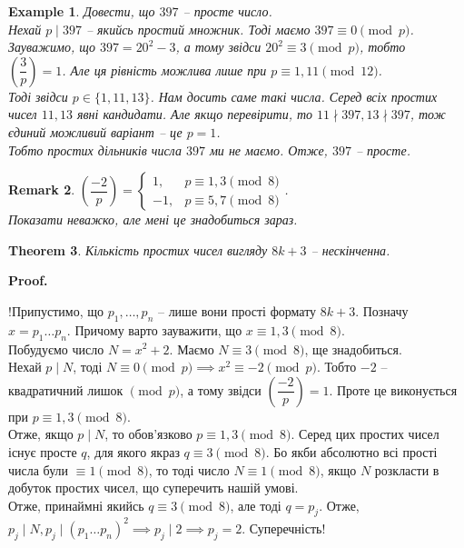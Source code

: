 \documentclass[a4paper, 10pt]{article}
\makeatletter
\theoremstyle{theoremdd}
\newtheorem{theorem}{Theorem}[subsection]
\theoremstyle{theoremdd}
\theoremstyle{theoremdd}
\theoremstyle{theoremdd}
\newtheorem{example}[theorem]{Example}
\theoremstyle{theoremdd}
\theoremstyle{theoremdd}
\newtheorem{remark}[theorem]{Remark}
\theoremstyle{theoremdd}
\theoremstyle{theoremdd}
\renewenvironment{proof}[1][Proof.\\]{\par
\pushQED{\hfill \qed}%
\normalfont \topsep6\p@\@plus6\p@\relax
\trivlist
\item\relax
{\bfseries
#1\@addpunct{.}}\hspace\labelsep\ignorespaces
}{%
\popQED\endtrivlist\@endpefalse
}
\makeatother
\begin{document}
\begin{example}
Довести, що $397$ -- просте число.\\
Нехай $p \mid 397$ -- якийсь простий множник. Тоді маємо $397 \equiv 0 \pmod p$.\\
Зауважимо, що $397 = 20^2-3$, а тому звідси $20^2 \equiv 3 \pmod p$, тобто\\
$\left( \dfrac{3}{p} \right) = 1$. Але ця рівність можлива лише при $p \equiv 1,11 \pmod {12}$.\\
Тоді звідси $p \in \{1,11,13\}$. Нам досить саме такі числа. Серед всіх простих чисел $11,13$ явні кандидати. Але якщо перевірити, то $11 \nmid 397, 13 \nmid 397$, тож єдиний можливий варіант -- це $p = 1$.\\
Тобто простих дільників числа $397$ ми не маємо. Отже, $397$ -- просте.
\end{example}

\begin{remark}
$\left( \dfrac{-2}{p} \right) = \begin{cases} 1, & p \equiv 1,3 \pmod 8 \\ -1, & p \equiv 5,7 \pmod 8 \end{cases}$.\\
Показати неважко, але мені це знадобиться зараз.
\end{remark}

\begin{theorem}
Кількість простих чисел вигляду $8k+3$ -- нескінченна.
\end{theorem}

\begin{proof}
!Припустимо, що $p_1,\dots,p_n$ -- лише вони прості формату $8k+3$. Позначу $x = p_1\dots p_n$. Причому варто зауважити, що $x \equiv 1,3 \pmod 8$.\\
Побудуємо число $N = x^2+2$. Маємо $N \equiv 3 \pmod 8$, ще знадобиться.\\
Нехай $p \mid N$, тоді $N \equiv 0 \pmod p \implies x^2 \equiv -2 \pmod p$. Тобто $-2$ -- квадратичний лишок $\!\! \pmod p$, а тому звідси $\left( \dfrac{-2}{p} \right) = 1$. Проте це виконується при $p \equiv 1,3 \pmod 8$.\\
Отже, якщо $p \mid N$, то обов'язково $p \equiv 1,3 \pmod 8$. Серед цих простих чисел існує просте $q$, для якого якраз $q \equiv 3 \pmod 8$. Бо якби абсолютно всі прості числа були $\equiv 1 \pmod 8$, то тоді число $N \equiv 1 \pmod 8$, якщо $N$ розкласти в добуток простих чисел, що суперечить нашій умові.\\
Отже, принаймні якийсь $q \equiv 3 \pmod 8$, але тоді $q = p_j$. Отже, \\
$p_j \mid N, p_j \mid (p_1\dots p_n)^2 \implies p_j \mid 2 \implies p_j = 2$. Суперечність!
\end{proof}
\end{document}
